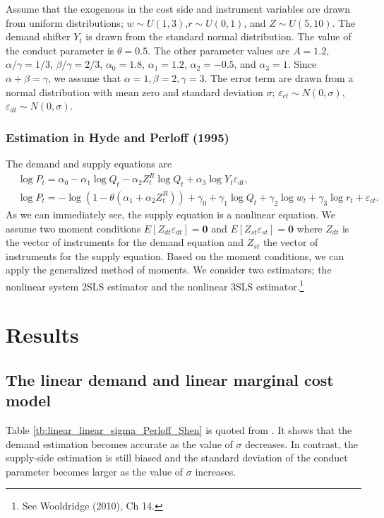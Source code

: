 \documentclass[11pt, a4paper]{article}
\begin{document}
Assume that the exogenous in the cost side and instrument variables are drawn from uniform distributions; $w \sim U(1,3)$,$r \sim U(0,1)$, and $Z \sim U(5, 10)$. The demand shifter $Y_t$ is drawn from the standard normal distribution.
The value of the conduct parameter is $\theta = 0.5$. 
The other parameter values are $A = 1.2$, $\alpha/\gamma = 1/3$, $\beta/\gamma = 2/3$, $\alpha_0 = 1.8$, $\alpha_1 = 1.2$, $\alpha_2 = -0.5$, and $\alpha_3 = 1$.
Since $\alpha + \beta = \gamma$, we assume that $\alpha = 1, \beta = 2, \gamma = 3$.
The error term are drawn from a normal distribution with mean zero and standard deviation $\sigma$; $\varepsilon_{ct}\sim N(0,\sigma)$, $\varepsilon_{dt} \sim N(0,\sigma)$.






\subsubsection{Estimation in Hyde and Perloff (1995)}
The demand and supply equations are
\begin{align}
    &\log P_{t} = \alpha_0 - \alpha_1 \log Q_t - \alpha_2 Z^R_t\log Q_t + \alpha_3 \log Y_t \varepsilon_{dt},\\
    &\log P_t  = - \log(1 - \theta(\alpha_1 + \alpha_2 Z^R_t)) + \gamma_0 + \gamma_1 \log Q_t +  \gamma_2 \log w_t + \gamma_3 \log r_t + \varepsilon_{ct}.
\end{align}
As we can immediately see, the supply equation is a nonlinear equation.
We assume two moment conditions $E[Z_{dt} \varepsilon_{dt}] = \bm0 $ and $ E[Z_{st} \varepsilon_{st}] =\bm0$ where $Z_{dt}$ is the vector of instruments for the demand equation and $Z_{st}$ the vector of instruments for the supply equation.
Based on the moment conditions, we can apply the generalized method of moments.
We consider two estimators; the nonlinear system 2SLS estimator and the nonlinear 3SLS estimator.\footnote{See Wooldridge (2010), Ch 14.}



\section{Results}


\subsection{The linear demand and linear marginal cost model}
Table \ref{tb:linear_linear_sigma_Perloff_Shen} is quoted from \cite{perloff2012collinearity}.
It shows that the demand estimation becomes accurate as the value of $\sigma$ decreases.
In contrast, the supply-side estimation is still biased and the standard deviation of the conduct parameter becomes larger as the value of $\sigma$ increases.
\end{document}
